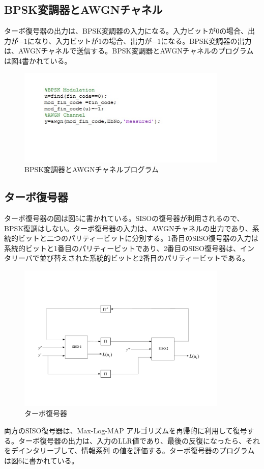 \documentclass[20 pts]{article}
\begin{document}
\subsection{BPSK変調器とAWGNチャネル}
ターボ復号器の出力は、BPSK変調器の入力になる。入力ビットが$0$の場合、出力が$-1$になり、入力ビットが$1$の場合、出力が$-1$になる。BPSK変調器の出力は、AWGNチャネルで送信する。BPSK変調器とAWGNチャネルのプログラムは図4書かれている。
\begin{figure}[h!]
\includegraphics[width=10cm]{zu4.jpg}
\caption{BPSK変調器とAWGNチャネルプログラム}
\label{}
\end{figure}

\subsection{ターボ復号器}
ターボ復号器の図は図5に書かれている。SISOの復号器が利用されるので、BPSK復調はしない。ターボ復号器の入力は、AWGNチャネルの出力であり、系統的ビットと二つのパリティービットに分別する。1番目のSISO復号器の入力は系統的ビットと1番目のパリティービットであり、2番目のSISO復号器は、インタリーバで並び替えされた系統的ビットと2番目のパリティービットである。	
\begin{figure}[h!]
\includegraphics[width=10cm]{D1.pdf}
\caption{ターボ復号器}
\label{図2}
\end{figure}%
両方のSISO復号器は、Max-Log-MAP アルゴリズムを再帰的に利用して復号する。ターボ復号器の出力は、入力のLLR値であり、最後の反復になったら、それ をデインタリーブして、情報系列 の値を評価する。ターボ復号器のプログラムは図6に書かれている。
\end{document}
